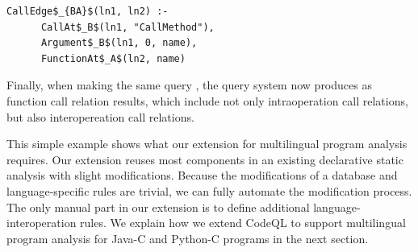 
\begin{lstlisting}[style=mrule]
    CallEdge$_{BA}$(ln1, ln2) :-
      CallAt$_B$(ln1, "CallMethod"),
      Argument$_B$(ln1, 0, name),
      FunctionAt$_A$(ln2, name)
\end{lstlisting}

%

Finally, when making the same query , the query system
now produces   as function call relation results,
which include not only intraoperation call relations,
but also interopereation call relations. 

This simple example shows what our extension for multilingual program analysis
requires. Our extension reuses most components in an existing declarative static
analysis with slight modifications. Because the modifications of a database and
language-specific rules are trivial, we can fully automate the modification
process.  The only manual part in our extension is to define additional
language-interoperation rules. We explain how we extend CodeQL to support
multilingual program analysis for Java-C and Python-C programs in the next section.


